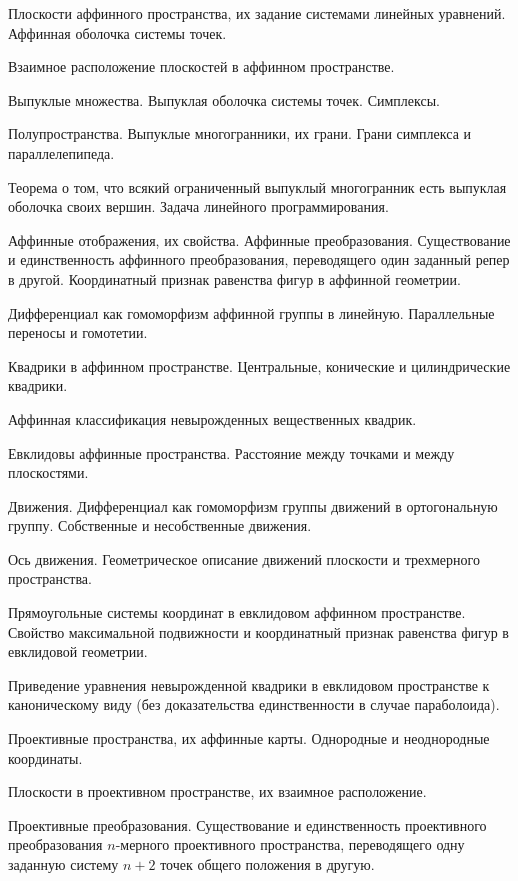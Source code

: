 \documentclass[a4paper]{article}
\begin{document}
\begin{nums}{-1}
\item Плоскости аффинного пространства, их задание системами линейных уравнений. Аффинная оболочка системы точек.
\item Взаимное расположение плоскостей в аффинном пространстве.
\item Выпуклые множества. Выпуклая оболочка системы точек. Симплексы.
\item Полупространства. Выпуклые многогранники, их грани. Грани симплекса и параллелепипеда.
\item Теорема о том, что всякий ограниченный выпуклый многогранник есть выпуклая оболочка своих вершин. Задача линейного программирования.
\item Аффинные отображения, их свойства. Аффинные преобразования. Существование и единственность аффинного преобразования,
переводящего один заданный репер в другой. Координатный признак равенства фигур в аффинной геометрии.
\item Дифференциал как гомоморфизм аффинной группы в линейную. Параллельные переносы и гомотетии.
\item Квадрики в аффинном пространстве. Центральные, конические и цилиндрические квадрики.
\item Аффинная классификация невырожденных вещественных квадрик.
\item Евклидовы аффинные пространства. Расстояние между точками и между плоскостями.
\item Движения. Дифференциал как гомоморфизм группы движений в ортогональную группу. Собственные и несобственные движения.
\item Ось движения. Геометрическое описание движений плоскости и трехмерного пространства.
\item Прямоугольные системы координат в евклидовом аффинном пространстве. Свойство максимальной подвижности и координатный
признак равенства фигур в евклидовой геометрии.
\item Приведение уравнения невырожденной квадрики в евклидовом пространстве к каноническому
виду (без доказательства единственности в случае параболоида).
\item Проективные пространства, их аффинные карты. Однородные и неоднородные координаты.
\item Плоскости в проективном пространстве, их взаимное расположение.
\item Проективные преобразования. Существование и единственность проективного преобразования $n$-мерного проективного пространства,
переводящего одну заданную систему $n+2$ точек общего положения в другую.

\end{nums}
\end{document}
